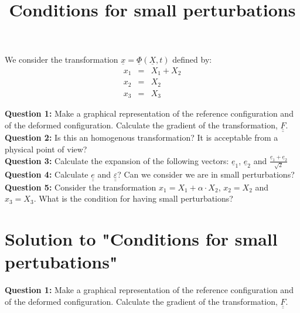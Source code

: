 \documentclass[letter,12pt]{article}
\newcommand{\TT}[1]{\underline{\underline{#1}}}
\newcommand{\T}[1]{\underline{#1}}
\begin{document}
\pagestyle{fancy}

\title{\textbf{Conditions for small perturbations}}
\date{}

\maketitle

\vspace{-1cm}

We consider the transformation  $\T{x}=\T{\Phi}(\T{X},t)$ defined by: 
\begin{eqnarray}
	x_1 & = & X_1+X_2 \\ 
	x_2 & = & X_2 \\ 
	x_3 & = & X_3 
\end{eqnarray}



	\noindent \textbf{Question 1:} Make a graphical representation of the reference configuration and of the deformed configuration. Calculate the gradient of the transformation, $\TT{F}$. \\
	
	\noindent \textbf{Question 2:} Is this an homogenous transformation? It is acceptable from a physical point of view? \\
	
	\noindent \textbf{Question 3:} Calculate the expansion of the following vectors: $\T{e}_1$, $\T{e}_2$ and $\frac{\T{e}_1+\T{e}_2}{\sqrt{2}}$ \\
	
	\noindent \textbf{Question 4:} Calculate $\TT{e}$ and $\TT{\varepsilon}$? Can we consider we are in small perturbations? \\
	
	\noindent \textbf{Question 5:} Consider the transformation $x_1=X_1+\alpha \cdot X_2$, $x_2=X_2$ and $x_3=X_3$. What is the condition for having small perturbations?


\newpage
\section*{Solution to "Conditions for small pertubations"} 

	\noindent \textbf{Question 1:} Make a graphical representation of the reference configuration and of the deformed configuration. Calculate the gradient of the transformation, $\TT{F}$. \\
	
\end{document}
